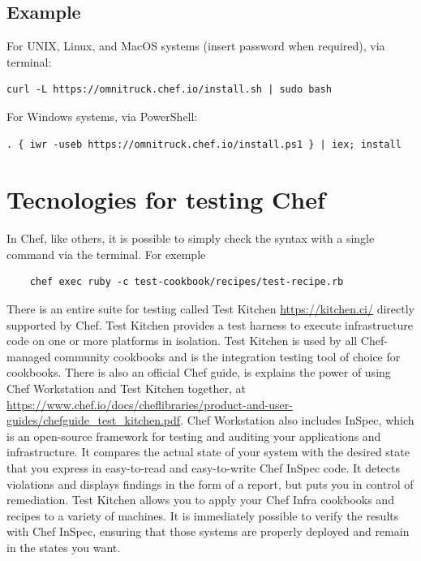 \documentclass[12pt,a4paper,openright,twoside]{book}
\begin{document}
\cite{chefDocInstall}

\subsection{Example}

For UNIX, Linux, and MacOS systems (insert password when required), via terminal:


\begin{lstlisting}
curl -L https://omnitruck.chef.io/install.sh | sudo bash
\end{lstlisting}


For Windows systems, via PowerShell:
\begin{lstlisting}
. { iwr -useb https://omnitruck.chef.io/install.ps1 } | iex; install
\end{lstlisting}


\cite{chefDocInstall}

\section{Tecnologies for testing Chef}
In Chef, like others, it is possible to simply check the syntax with a single command via the terminal.
For exemple\cite{chefTestMedium}
\begin{lstlisting}
    chef exec ruby -c test-cookbook/recipes/test-recipe.rb
\end{lstlisting}


There is an entire suite for testing called Test Kitchen \url{https://kitchen.ci/} directly supported by Chef.
Test Kitchen provides a test harness to execute infrastructure code on one or more platforms in isolation.\cite{chefTestKit}
Test Kitchen is used by all Chef-managed community cookbooks and is the integration testing tool of choice for cookbooks.\cite{chefTestKit}
There is also an official Chef guide, is explains the power of using Chef Workstation and Test Kitchen together, at \url{https://www.chef.io/docs/cheflibraries/product-and-user-guides/chefguide_test_kitchen.pdf}.
Chef Workstation also includes InSpec, which is an open-source framework for testing and auditing your applications and infrastructure. It compares the actual state of your system with the desired state that you express in easy-to-read and easy-to-write Chef InSpec code. It detects violations and displays findings in the form of a report, but puts you in control of remediation.\cite{chefInSpec}
Test Kitchen allows you to apply your Chef Infra cookbooks and recipes to a variety of machines. It is immediately possible to verify the results with Chef InSpec, ensuring that those systems are properly deployed and remain in the states you want.\cite{chefTestKitPdf}
\end{document}
